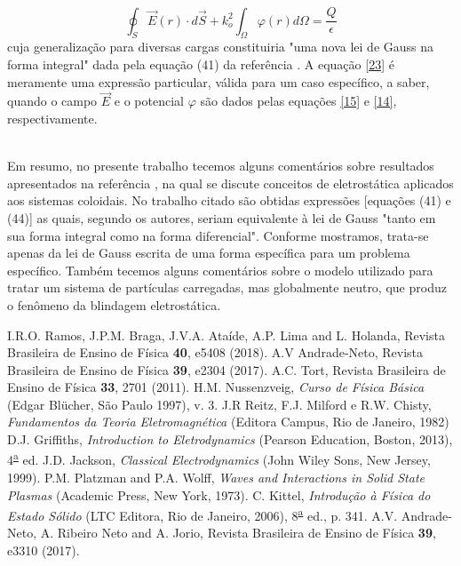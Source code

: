 \documentclass[brazilian,10.7pt,a4paper]{article}
\begin{document}
\\
\begin{equation}\label{23}
\oint_{S}{\vec{E}(r)\cdot d\vec{S}+k^{2}_{o}}\int_{\Omega}{\varphi(r)d\Omega}=\frac{Q}{\epsilon}
\end{equation}
cuja generalização para diversas cargas constituiria "uma nova lei de Gauss na forma integral" dada pela equação (41) da referência \cite{ramos}. A equação \eqref{23} é meramente uma expressão particular, válida para um caso específico, a saber, quando o campo $\vec{E}$ e o potencial $\varphi$ são dados pelas equações \eqref{15} e \eqref{14}, respectivamente.\\
\\
\par Em resumo, no presente trabalho tecemos alguns comentários sobre resultados apresentados na referência \cite{ramos}, na qual se discute conceitos de eletrostática aplicados aos sistemas coloidais. No trabalho citado são obtidas expressões [equações (41) e (44)] as quais, segundo os autores, seriam equivalente à lei de Gauss "tanto em sua forma integral como na forma diferencial". Conforme mostramos, trata-se apenas da lei de Gauss escrita de uma forma específica para um problema específico. Também tecemos alguns comentários sobre o modelo utilizado para tratar um sistema de partículas carregadas, mas globalmente neutro, que produz o fenômeno da blindagem eletrostática.
\\
\begin{thebibliography}{10}
\small{
I.R.O. Ramos, J.P.M. Braga, J.V.A. Ataíde, A.P. Lima and L. Holanda, Revista Brasileira de Ensino de Física \textbf{40}, e5408 (2018).
A.V Andrade-Neto, Revista Brasileira de Ensino de Física \textbf{39}, e2304 (2017).
A.C. Tort, Revista Brasileira de Ensino de Física \textbf{33}, 2701 (2011).
H.M. Nussenzveig, \textit{Curso de Física Básica} (Edgar Blücher, São Paulo 1997), v. 3.
J.R Reitz, F.J. Milford e R.W. Chisty, \textit{Fundamentos da Teoria Eletromagnética} (Editora Campus, Rio de Janeiro, 1982)
D.J. Griffiths, \textit{Introduction to Eletrodynamics} (Pearson Education, Boston, 2013), 4\textsuperscript{\underline{a}} ed.
J.D. Jackson, \textit{Classical Electrodynamics} (John Wiley Sons, New Jersey, 1999).
P.M. Platzman and P.A. Wolff, \textit{Waves and Interactions in Solid State Plasmas} (Academic Press, New York, 1973).
C. Kittel, \textit{Introdução à Física do Estado Sólido} (LTC Editora, Rio de Janeiro, 2006), 8\textsuperscript{\underline{a}} ed., p. 341.
A.V. Andrade-Neto, A. Ribeiro Neto and A. Jorio, Revista Brasileira de Ensino de Física \textbf{39}, e3310 (2017).
}
\end{thebibliography}
\end{document}

